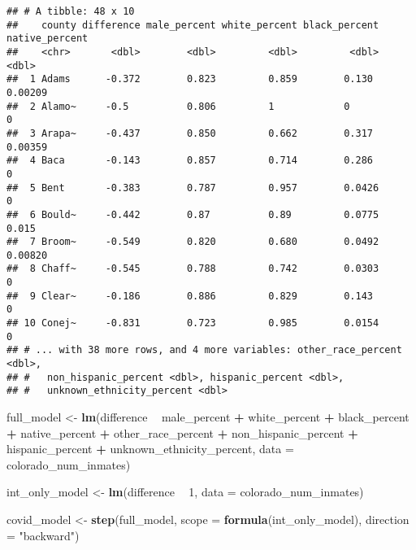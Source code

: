 \documentclass[
]{article}
\newenvironment{Shaded}{\begin{snugshade}}{\end{snugshade}}
\newcommand{\DataTypeTok}[1]{\textcolor[rgb]{0.13,0.29,0.53}{#1}}
\newcommand{\DecValTok}[1]{\textcolor[rgb]{0.00,0.00,0.81}{#1}}
\newcommand{\KeywordTok}[1]{\textcolor[rgb]{0.13,0.29,0.53}{\textbf{#1}}}
\newcommand{\NormalTok}[1]{#1}
\newcommand{\OperatorTok}[1]{\textcolor[rgb]{0.81,0.36,0.00}{\textbf{#1}}}
\newcommand{\StringTok}[1]{\textcolor[rgb]{0.31,0.60,0.02}{#1}}
\begin{document}
\begin{verbatim}
## # A tibble: 48 x 10
##    county difference male_percent white_percent black_percent native_percent
##    <chr>       <dbl>        <dbl>         <dbl>         <dbl>          <dbl>
##  1 Adams      -0.372        0.823         0.859        0.130         0.00209
##  2 Alamo~     -0.5          0.806         1            0             0      
##  3 Arapa~     -0.437        0.850         0.662        0.317         0.00359
##  4 Baca       -0.143        0.857         0.714        0.286         0      
##  5 Bent       -0.383        0.787         0.957        0.0426        0      
##  6 Bould~     -0.442        0.87          0.89         0.0775        0.015  
##  7 Broom~     -0.549        0.820         0.680        0.0492        0.00820
##  8 Chaff~     -0.545        0.788         0.742        0.0303        0      
##  9 Clear~     -0.186        0.886         0.829        0.143         0      
## 10 Conej~     -0.831        0.723         0.985        0.0154        0      
## # ... with 38 more rows, and 4 more variables: other_race_percent <dbl>,
## #   non_hispanic_percent <dbl>, hispanic_percent <dbl>,
## #   unknown_ethnicity_percent <dbl>
\end{verbatim}

\begin{Shaded}
\begin{Highlighting}[]
\NormalTok{full_model <-}\StringTok{ }\KeywordTok{lm}\NormalTok{(difference }\OperatorTok{~}\StringTok{ }
\StringTok{                    }\NormalTok{male_percent }\OperatorTok{+}
\StringTok{                    }\NormalTok{white_percent }\OperatorTok{+}\StringTok{ }
\StringTok{                    }\NormalTok{black_percent }\OperatorTok{+}\StringTok{ }
\StringTok{                    }\NormalTok{native_percent }\OperatorTok{+}\StringTok{ }
\StringTok{                    }\NormalTok{other_race_percent }\OperatorTok{+}\StringTok{ }
\StringTok{                    }\NormalTok{non_hispanic_percent }\OperatorTok{+}\StringTok{ }
\StringTok{                    }\NormalTok{hispanic_percent }\OperatorTok{+}\StringTok{ }
\StringTok{                    }\NormalTok{unknown_ethnicity_percent, }
                  \DataTypeTok{data =}\NormalTok{ colorado_num_inmates)}

\NormalTok{int_only_model <-}\StringTok{ }\KeywordTok{lm}\NormalTok{(difference }\OperatorTok{~}\StringTok{ }\DecValTok{1}\NormalTok{, }\DataTypeTok{data =}\NormalTok{ colorado_num_inmates)}

\NormalTok{covid_model <-}\StringTok{ }\KeywordTok{step}\NormalTok{(full_model, }\DataTypeTok{scope =} \KeywordTok{formula}\NormalTok{(int_only_model), }\DataTypeTok{direction =} \StringTok{"backward"}\NormalTok{)}
\end{Highlighting}
\end{Shaded}
\end{document}
